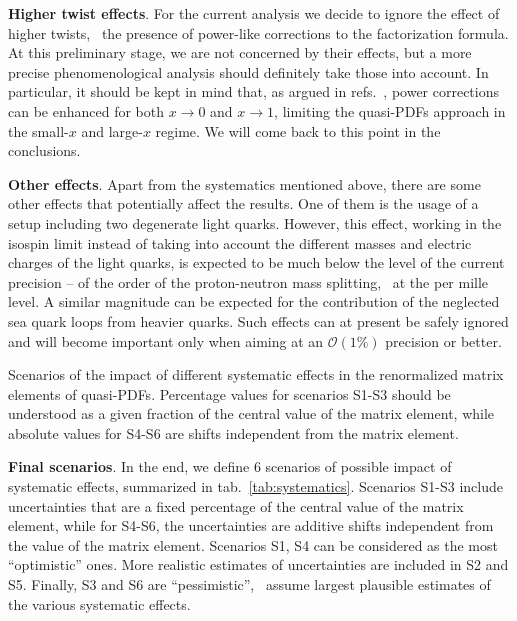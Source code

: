 \textbf{Higher twist effects}. For the current analysis we decide to ignore the
effect of higher twists, \ie\ the presence of power-like corrections to the
factorization formula. At this preliminary stage, we are not concerned by their
effects, but a more precise phenomenological analysis should definitely take
those into account. In particular, it should be kept in mind that, as argued in refs.~\cite{Izubuchi:2018srq},
power corrections can be enhanced for both $x\rightarrow 0$ and $x\rightarrow 1$, limiting
the quasi-PDFs approach in the small-$x$ and large-$x$ regime. We will come back to this point in the conclusions. 

\textbf{Other effects}. Apart from the systematics mentioned above, there are
some other effects that potentially affect the results. One of them is the usage
of a setup including two degenerate light quarks. However, this effect, working
in the isospin limit instead of taking into account the different masses and
electric charges of the light quarks, is expected to be much below the level of
the current precision -- of the order of the proton-neutron mass splitting, \ie\
at the per mille level. A similar magnitude can be expected for the contribution
of the neglected sea quark loops from heavier quarks. Such effects can at
present be safely ignored and will become important only when aiming at an
$\mathcal{O}(1\%)$ precision or better.


\begin{table}[!t]
    \centering
    \scriptsize
    \renewcommand{\arraystretch}{1.90}
    
    \vspace{0.3cm}
    \caption{Scenarios of the impact of different systematic effects 
    in the renormalized matrix elements of quasi-PDFs. Percentage values for scenarios 
    S1-S3 should be understood as a given fraction of the central value of the matrix element, 
    while absolute values for S4-S6 are shifts independent from the matrix element.}
    \label{tab:systematics}
\end{table}


\textbf{Final scenarios}. In the end, we define 6 scenarios of possible impact
of systematic effects, summarized in tab.~\ref{tab:systematics}. Scenarios S1-S3
include uncer\-tain\-ties that are a fixed percentage of the central value of
the matrix element, while for S4-S6, the uncertainties are additive shifts
independent from the value of the matrix element. Scenarios S1, S4 can be
considered as the most ``optimistic'' ones. More realistic estimates of
uncertainties are included in S2 and S5. Finally, S3 and S6 are ``pessimistic'',
\ie\ assume largest plausible estimates of the various systematic effects.


